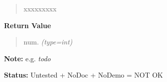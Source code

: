 \begin{boxedminipage}{\funcwidth}
\begin{quote}
\begin{Ventry}{xxxxxxxxx}
        \end{Ventry}

      \end{quote}

      \textbf{Return Value}
    \vspace{-1ex}

      \begin{quote}

num.
      {\it (type=int)}

      \end{quote}

\textbf{Note:} 
e.g. \emph{todo}


\textbf{Status:} 
Untested + NoDoc + NoDemo = NOT OK


    \end{boxedminipage}

    \label{xformslib:flflimage:flimage_autocrop}

    \vspace{0.5ex}

